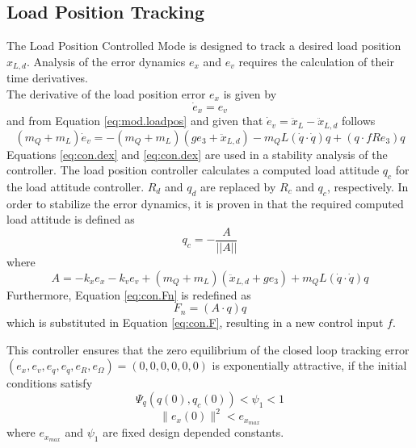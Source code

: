 \subsection{Load Position Tracking}\label{sec:con.loadpos}
The Load Position Controlled Mode is designed to track a desired load position $ x_{L,d} $. 
Analysis of the error dynamics $ e_x $ and $ e_v $ requires the calculation of their time derivatives.\\
The derivative of the load position error $ e_x $ is given by
\begin{equation}\label{eq:con.dex}
\dot{e}_x = e_v
\end{equation}
and from Equation \ref{eq:mod.loadpos} and given that $ \dot{e}_v=\ddot{x}_L-\ddot{x}_{L,d} $ follows
\begin{equation}\label{eq:con.dev}
(m_Q+m_L)\dot{e}_v=-(m_Q+m_L)(ge_3+\ddot{x}_{L,d})-m_QL(\dot{q}\cdot\dot{q})q+(q\cdot fRe_3)q
\end{equation}
Equations \ref{eq:con.dex} and \ref{eq:con.dex} are used in a stability analysis of the controller. 
The load position controller calculates a computed load attitude $ q_c$ for the load attitude controller. $ R_d $ and $ q_d $ are replaced by $ R_c $ and $ q_c $, respectively. 
In order to stabilize the error dynamics, it is proven in \cite{Sreenath2013c} that the required computed load attitude is defined as
\begin{equation}\label{eq:con.q}
q_c = - \frac{A}{||A||}
\end{equation}
where
\begin{equation}\label{eq:con.A}
A = -k_xe_x-k_ve_v+(m_Q+m_L)(\ddot{x}_{L,d}+ge_3)+m_QL(\dot{q}\cdot\dot{q})q
\end{equation}
Furthermore, Equation \ref{eq:con.Fn} is redefined as
\begin{equation}\label{key}
F_n=(A\cdot q)q
\end{equation}
which is substituted in Equation \ref{eq:con.F}, resulting in a new control input $ f $. 

This controller ensures that the zero equilibrium of the closed loop tracking error $ (e_x,e_v,e_q,e_{\dot{q}},e_R,e_\Omega)=(0,0,0,0,0,0) $ is exponentially attractive, if the initial conditions satisfy
\begin{equation}\label{eq:dom5}
\Psi_q(q(0),q_c(0))<\psi_1<1
\end{equation}
\begin{equation}
\parallel e_{x}(0)\parallel^2<e_{x_{max}}
\end{equation}
where $ e_{x_{max}} $ and $ \psi_1 $ are fixed design depended constants. 

